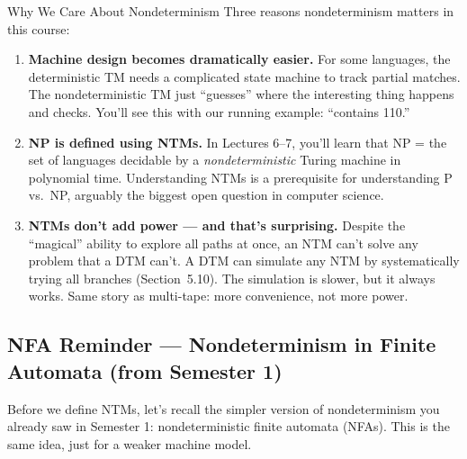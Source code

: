 \begin{conceptbox}{Why We Care About Nondeterminism}
Three reasons nondeterminism matters in this course:

\begin{enumerate}
\item \textbf{Machine design becomes dramatically easier.} For some languages,
  the deterministic TM needs a complicated state machine to track partial
  matches. The nondeterministic TM just ``guesses'' where the interesting thing
  happens and checks. You'll see this with our running example: ``contains 110.''

\item \textbf{NP is defined using NTMs.} In Lectures 6--7, you'll learn that
  $\text{NP}$ = the set of languages decidable by a \emph{nondeterministic}
  Turing machine in polynomial time. Understanding NTMs is a prerequisite
  for understanding P vs.\ NP, arguably the biggest open question in computer
  science.

\item \textbf{NTMs don't add power --- and that's surprising.} Despite the
  ``magical'' ability to explore all paths at once, an NTM can't solve any
  problem that a DTM can't. A DTM can simulate any NTM by systematically trying
  all branches (Section~5.10). The simulation is slower, but it always works.
  Same story as multi-tape: more convenience, not more power.
\end{enumerate}

\end{conceptbox}

\subsection{NFA Reminder --- Nondeterminism in Finite Automata (from Semester 1)}
\label{subsec:nfa-reminder}

Before we define NTMs, let's recall the simpler version of nondeterminism you
already saw in Semester 1: nondeterministic finite automata (NFAs). This is the
same idea, just for a weaker machine model.

